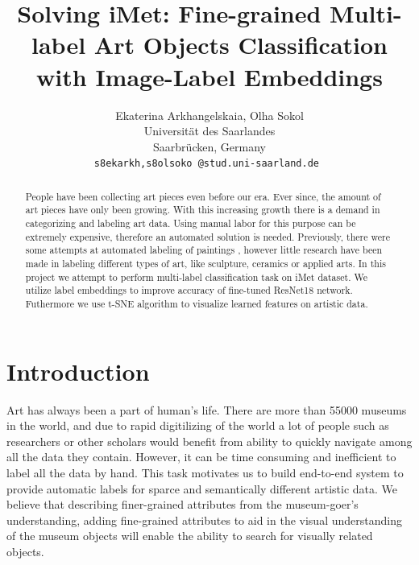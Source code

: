 \documentclass[10pt,twocolumn,letterpaper]{article}
\begin{document}
\title{Solving iMet: Fine-grained Multi-label Art Objects Classification with Image-Label Embeddings}

\author{Ekaterina Arkhangelskaia, Olha Sokol\\
Universit{\"a}t des Saarlandes\\
Saarbr{\"u}cken, Germany\\
{\tt\small s8ekarkh,s8olsoko @stud.uni-saarland.de }
}

\maketitle

\begin{abstract}
   People have been collecting art pieces even before our era. Ever since, the amount of art pieces have only been growing. With this increasing growth there is a demand in categorizing and labeling art data. Using manual labor for this purpose can be extremely expensive, therefore an automated solution is needed. Previously, there were some attempts at automated labeling of paintings \cite{Rijks}, however little research have been made in labeling different types of art, like sculpture, ceramics or applied arts. 
   In this project we attempt to perform multi-label classification task on iMet dataset. We utilize label embeddings to improve accuracy of fine-tuned ResNet18 network. Futhermore we use t-SNE algorithm to visualize learned features on artistic data. 

\end{abstract}

\section{Introduction}
Art has always been a part of human's life. There are more than 55000 museums in the world, and due to rapid digitilizing of the world a lot of people such as researchers or other scholars would benefit from ability to quickly  navigate among all the data they contain. However, it can be time consuming and inefficient to label all the data by hand. This task motivates us to build end-to-end system to provide automatic labels for sparce and semantically different artistic data. We believe that describing finer-grained attributes from the museum-goer’s understanding, adding fine-grained attributes to aid in the visual understanding of the museum objects will enable the ability to search for visually related objects.
\end{document}

